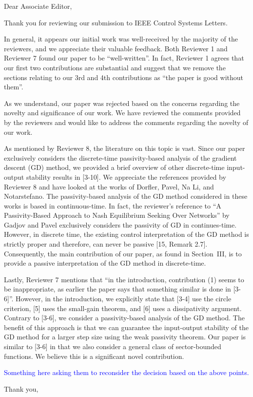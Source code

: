 \thispagestyle{empty}
\setcounter{page}{0}
\begin{flushleft}
    Dear Associate Editor,

    Thank you for reviewing our submission to IEEE Control Systems Letters.

    In general, it appears our initial work was well-received by the majority of the reviewers, and we appreciate their valuable feedback. Both Reviewer 1 and Reviewer 7 found our paper to be ``well-written''. In fact, Reviewer 1 agrees that our first two contributions are substantial and suggest that we remove the sections relating to our 3rd and 4th contributions as ``the paper is good without them''.
    
    As we understand, our paper was rejected based on the concerns regarding the novelty and significance of our work. We have reviewed the comments provided by the reviewers and would like to address the comments regarding the novelty of our work.

    As mentioned by Reviewer 8, the literature on this topic is vast. Since our paper exclusively considers the discrete-time passivity-based analysis of the gradient descent (GD) method, we provided a brief overview of other discrete-time input-output stability results in [3-10]. We appreciate the references provided by Reviewer 8 and have looked at the works of Dorfler, Pavel, Na Li, and Notarstefano. The passivity-based analysis of the GD method considered in these works is based in continuous-time. In fact, the reviewer's reference to ``A Passivity-Based Approach to Nash Equilibrium Seeking Over Networks'' by Gadjov and Pavel exclusively considers the passivity of GD in continues-time. However, in discrete time, the existing control interpretation of the GD method is strictly proper and therefore, can never be passive [15, Remark 2.7]. Consequently, the main contribution of our paper, as found in Section~III, is to provide a passive interpretation of the GD method in discrete-time.

    Lastly, Reviewer 7 mentions that ``in the introduction, contribution (1) seems to be inappropriate, as earlier the paper says that something similar is done in [3-6]''. However, in the introduction, we explicitly state that [3-4] use the circle criterion, [5] uses the small-gain theorem, and [6] uses a dissipativity argument. Contrary to [3-6], we consider a passivity-based analysis of the GD method. The benefit of this approach is that we can guarantee the input-output stability of the GD method for a larger step size using the weak passivity theorem. Our paper is similar to [3-6] in that we also consider a general class of sector-bounded functions. We believe this is a significant novel contribution.

    \textcolor{blue}{Something here asking them to reconsider the decision based on the above points.}

    Thank you,\\[1em]%
    \theauthor
\end{flushleft}
\newpage